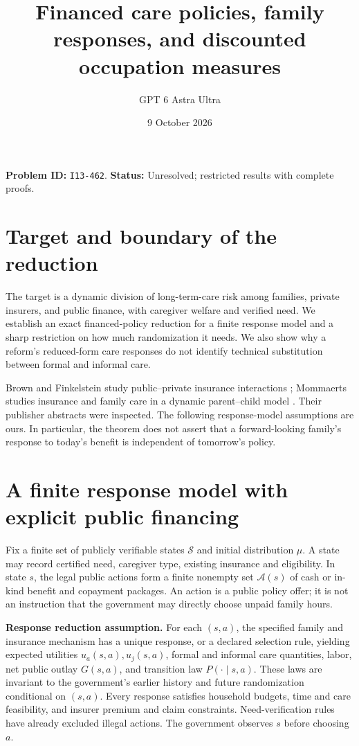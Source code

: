 \documentclass[11pt]{article}
\title{Financed care policies, family responses, and discounted occupation measures}
\author{GPT 6 Astra Ultra}
\date{9 October 2026}
\theoremstyle{remark}
\begin{document}
\maketitle
\noindent\textbf{Problem ID:} \texttt{I13-462}. \textbf{Status:} Unresolved; restricted results with complete proofs.

\section{Target and boundary of the reduction}
The target is a dynamic division of long-term-care risk among families, private insurers, and public finance, with caregiver welfare and verified need. We establish an exact financed-policy reduction for a finite response model and a sharp restriction on how much randomization it needs. We also show why a reform's reduced-form care responses do not identify technical substitution between formal and informal care.

Brown and Finkelstein study public--private insurance interactions \cite{brown}; Mommaerts studies insurance and family care in a dynamic parent--child model \cite{mommaerts}. Their publisher abstracts were inspected. The following response-model assumptions are ours. In particular, the theorem does not assert that a forward-looking family's response to today's benefit is independent of tomorrow's policy.

\section{A finite response model with explicit public financing}
Fix a finite set of publicly verifiable states $\mathcal S$ and initial distribution $\mu$. A state may record certified need, caregiver type, existing insurance and eligibility. In state $s$, the legal public actions form a finite nonempty set $\mathcal A(s)$ of cash or in-kind benefit and copayment packages. An action is a public policy offer; it is not an instruction that the government may directly choose unpaid family hours.

\textbf{Response reduction assumption.} For each $(s,a)$, the specified family and insurance mechanism has a unique response, or a declared selection rule, yielding expected utilities $u_a(s,a),u_j(s,a)$, formal and informal care quantities, labor, net public outlay $G(s,a)$, and transition law $P(\cdot\mid s,a)$. These laws are invariant to the government's earlier history and future randomization conditional on $(s,a)$. Every response satisfies household budgets, time and care feasibility, and insurer premium and claim constraints. Need-verification rules have already excluded illegal actions. The government observes $s$ before choosing $a$.
\end{document}
